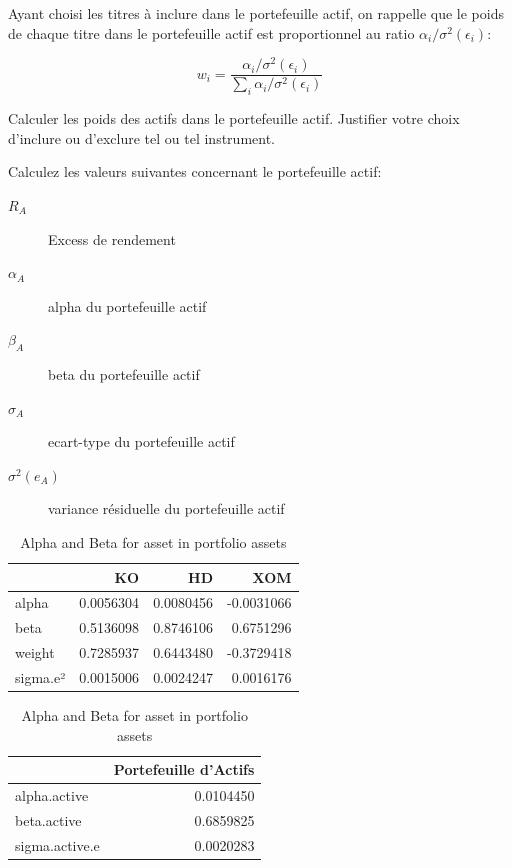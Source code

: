 \documentclass[
]{article}
\begin{document}
Ayant choisi les titres à inclure dans le portefeuille actif, on
rappelle que le poids de chaque titre dans le portefeuille actif est
proportionnel au ratio \(\alpha_i/\sigma^2(\epsilon_i)\):

\[
w_i = \frac{\alpha_i/\sigma^2(\epsilon_i)}{\sum_i \alpha_i/\sigma^2(\epsilon_i)}
\]

Calculer les poids des actifs dans le portefeuille actif. Justifier
votre choix d'inclure ou d'exclure tel ou tel instrument.

Calculez les valeurs suivantes concernant le portefeuille actif:

\begin{description}
\item[$R_A$] Excess de rendement
\item[$\alpha_A$] alpha du portefeuille actif
\item[$\beta_A$]  beta du portefeuille actif
\item[$\sigma_A$] ecart-type du portefeuille actif
\item[$\sigma^2(e_A)$] variance résiduelle du portefeuille actif
\end{description}

\begin{table}[H]

\caption{\label{tab:unnamed-chunk-10}Alpha and Beta for asset in portfolio assets}
\centering
\begin{tabular}[t]{lrrr}
\toprule
  & KO & HD & XOM\\
\midrule
alpha & 0.0056304 & 0.0080456 & -0.0031066\\
beta & 0.5136098 & 0.8746106 & 0.6751296\\
weight & 0.7285937 & 0.6443480 & -0.3729418\\
sigma.e² & 0.0015006 & 0.0024247 & 0.0016176\\
\bottomrule
\end{tabular}
\end{table}

\begin{table}[H]

\caption{\label{tab:unnamed-chunk-11}Alpha and Beta for asset in portfolio assets}
\centering
\begin{tabular}[t]{lr}
\toprule
  & Portefeuille d'Actifs\\
\midrule
alpha.active & 0.0104450\\
beta.active & 0.6859825\\
sigma.active.e & 0.0020283\\
\bottomrule
\end{tabular}
\end{table}
\end{document}
